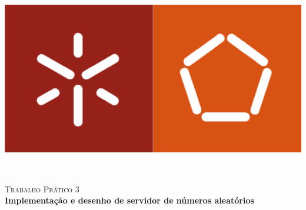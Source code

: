 \begin{titlepage}


\begin{minipage}{0.3\textwidth}
\begin{flushleft} 
\includegraphics[width=1.1\textwidth]{./resources/template/logo-ee.png}
\end{flushleft}
\end{minipage}
\hfill
\begin{minipage}{0.6\textwidth}
\begin{flushright} 

\end{flushright}
\end{minipage}\\[1cm]


\vspace{5cm}


\begin{center}



\textsc{\LARGE Trabalho Prático 3}\\[1cm]


{\Large \bfseries Implementação e desenho de servidor de números aleatórios\\[2cm]}

\vspace{1cm}
\begin{minipage}{0.7\textwidth}
\begin{center}


\end{center}
\end{minipage}
\end{center}
\end{titlepage}
